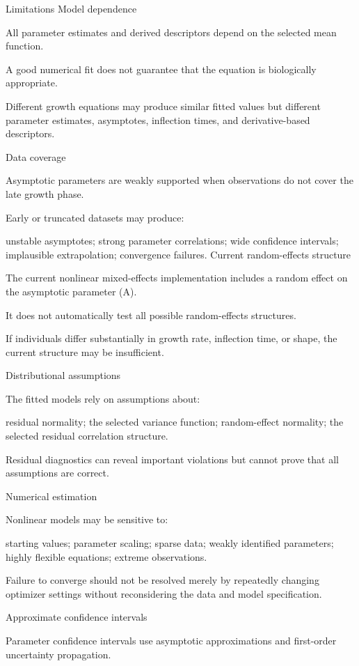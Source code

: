 \documentclass[
  english,
  letterpaper,
  DIV=11,
  numbers=noendperiod]{scrreprt}
\begin{document}
Limitations Model dependence

All parameter estimates and derived descriptors depend on the selected
mean function.

A good numerical fit does not guarantee that the equation is
biologically appropriate.

Different growth equations may produce similar fitted values but
different parameter estimates, asymptotes, inflection times, and
derivative-based descriptors.

Data coverage

Asymptotic parameters are weakly supported when observations do not
cover the late growth phase.

Early or truncated datasets may produce:

unstable asymptotes; strong parameter correlations; wide confidence
intervals; implausible extrapolation; convergence failures. Current
random-effects structure

The current nonlinear mixed-effects implementation includes a random
effect on the asymptotic parameter (A).

It does not automatically test all possible random-effects structures.

If individuals differ substantially in growth rate, inflection time, or
shape, the current structure may be insufficient.

Distributional assumptions

The fitted models rely on assumptions about:

residual normality; the selected variance function; random-effect
normality; the selected residual correlation structure.

Residual diagnostics can reveal important violations but cannot prove
that all assumptions are correct.

Numerical estimation

Nonlinear models may be sensitive to:

starting values; parameter scaling; sparse data; weakly identified
parameters; highly flexible equations; extreme observations.

Failure to converge should not be resolved merely by repeatedly changing
optimizer settings without reconsidering the data and model
specification.

Approximate confidence intervals

Parameter confidence intervals use asymptotic approximations and
first-order uncertainty propagation.
\end{document}
